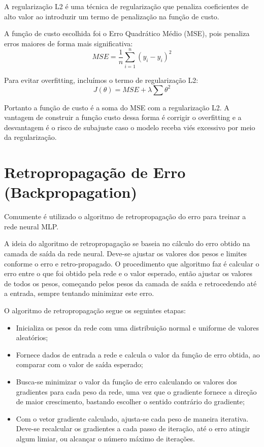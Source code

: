 \documentclass[12pt,a4paper,oneside]{report}
\begin{document}
A regularização L2 é uma técnica de regularização que penaliza coeficientes de alto valor ao introduzir um termo de penalização na função de custo\cite{murel:2023}. 

A fun\c{c}\~ao de custo escolhida foi o Erro Quadrático Médio (MSE), pois penaliza erros maiores de forma mais significativa:
\begin{equation}
	\label{eq:mse}
	MSE = \frac{1}{n}\sum_{i=1}^n (y_i - \hat{y}_i)^2
\end{equation}

Para evitar overfitting, incluímos o termo de regulariza\c{c}\~ao L2:
\begin{equation}
	J(\theta) = MSE + \lambda \sum \theta^2
\end{equation}

Portanto a função de custo é a soma do MSE com a regularização L2. A vantagem de construir a função custo dessa forma é corrigir o overfitting e a desvantagem é o risco de subajuste caso o modelo receba viés excessivo por meio da regularização.
	
	\section{Retropropagação de Erro (Backpropagation)}
	
	Comumente é utilizado o algoritmo de retropropagação do erro para treinar a rede neural MLP\cite{moreira:2018}.
	
	A ideia do algoritmo de retropropagação se baseia no cálculo do erro obtido na camada de saída da rede neural. Deve-se ajustar os valores dos pesos e limites conforme o erro e retro-propagado. O procedimento que algoritmo faz é calcular o erro entre o que foi obtido pela rede e o valor esperado, então ajustar os valores de todos os pesos, começando pelos pesos da camada de saída e retrocedendo até a entrada, sempre tentando minimizar este erro.
	
	O algoritmo de retropropagação segue os seguintes etapas:
	
	\begin{itemize}
		\item Inicializa os pesos da rede com uma distribuição normal e uniforme de valores aleatórios;
		
		\item Fornece dados de entrada a rede e calcula o valor da função de erro obtida, ao comparar com o valor de saída esperado;
		
		\item Busca-se minimizar o valor da função de erro calculando os valores dos gradientes para cada peso da rede, uma vez que o gradiente fornece a direção de maior crescimento, bastando escolher o sentido contrário do gradiente;
		
		\item Com o vetor gradiente calculado, ajusta-se cada peso de maneira iterativa. Deve-se recalcular os gradientes a cada passo de iteração, até o erro atingir algum limiar, ou alcançar o número máximo de iterações.
	\end{itemize}
	
\end{document}
